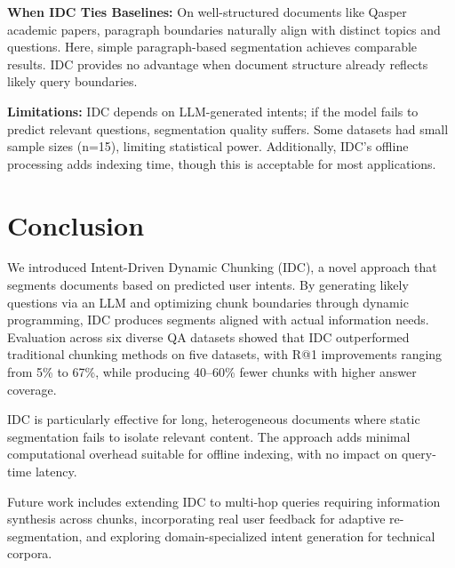 \documentclass[conference]{IEEEtran}
\begin{document}
\textbf{When IDC Ties Baselines:} On well-structured documents like Qasper academic papers, paragraph boundaries naturally align with distinct topics and questions. Here, simple paragraph-based segmentation achieves comparable results. IDC provides no advantage when document structure already reflects likely query boundaries.

\textbf{Limitations:} IDC depends on LLM-generated intents; if the model fails to predict relevant questions, segmentation quality suffers. Some datasets had small sample sizes (n=15), limiting statistical power. Additionally, IDC's offline processing adds indexing time, though this is acceptable for most applications.

\section{Conclusion}

We introduced Intent-Driven Dynamic Chunking (IDC), a novel approach that segments documents based on predicted user intents. By generating likely questions via an LLM and optimizing chunk boundaries through dynamic programming, IDC produces segments aligned with actual information needs. Evaluation across six diverse QA datasets showed that IDC outperformed traditional chunking methods on five datasets, with R@1 improvements ranging from 5\% to 67\%, while producing 40--60\% fewer chunks with higher answer coverage.

IDC is particularly effective for long, heterogeneous documents where static segmentation fails to isolate relevant content. The approach adds minimal computational overhead suitable for offline indexing, with no impact on query-time latency.

Future work includes extending IDC to multi-hop queries requiring information synthesis across chunks, incorporating real user feedback for adaptive re-segmentation, and exploring domain-specialized intent generation for technical corpora.
\end{document}
